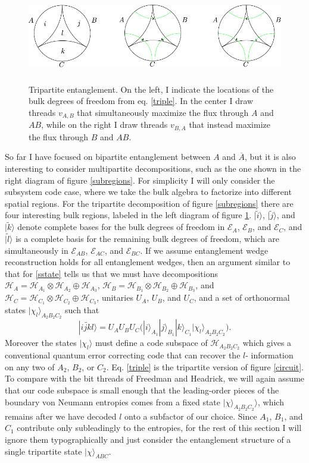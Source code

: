 \documentclass[12pt]{article}
\newcommand{\be}{\begin{equation}}
\newcommand{\ee}{\end{equation}}
\newcommand{\bfig}{\begin{figure}\begin{center}}
\newcommand{\efig}{\end{center}\end{figure}}
\newcommand{\ran}{\rangle}
\newcommand{\wt}{\widetilde}
\newcommand{\Hh}{\mathcal{H}}
\newcommand{\HA}{\mathcal{H}_A}
\newcommand{\Ab}{\ol{A}}
\newcommand{\ol}{\overline}
\begin{document}
\bfig
\includegraphics[height=4cm]{subregions2.pdf}
\caption{Tripartite entanglement.  On the left, I indicate the locations of the bulk degrees of freedom from eq. \eqref{triple}.  In the center I draw threads  $v_{A,B}$ that simultaneously maximize the flux through $A$ and $AB$, while on the right I draw threads $v_{B,A}$ that instead maximize the flux through $B$ and $AB$.}\label{mp}
\efig
So far I have focused on bipartite entanglement between $A$ and $\Ab$, but it is also interesting to consider multipartite decompositions, such as the one shown in the right diagram of figure \ref{subregions}.  For simplicity I will only consider the subsystem code case, where we take the bulk algebra to factorize into different spatial regions.  For the tripartite decomposition of figure \ref{subregions} there are four interesting bulk regions, labeled in the left diagram of figure \ref{mp}. $|\wt{i}\ran$, $|\wt{j}\ran$, and $|\wt{k}\ran$ denote complete bases for the bulk degrees of freedom in $\mathcal{E}_A$, $\mathcal{E}_B$, and $\mathcal{E}_C$, and $|\wt{l}\ran$ is a complete basis for the remaining bulk degrees of freedom, which are simultaneously in $\mathcal{E}_{AB}$, $\mathcal{E}_{AC}$, and $\mathcal{E}_{BC}$.  If we assume entanglement wedge reconstruction holds for all entanglement wedges, then an argument similar to that for \eqref{sstate} tells us that we must have decompositions $\HA=\Hh_{A_1}\otimes \Hh_{A_2}\oplus\Hh_{A_3}$, $\Hh_B=\Hh_{B_1}\otimes \Hh_{B_2}\oplus\Hh_{B_3}$, and $\Hh_C=\Hh_{C_1}\otimes \Hh_{C_2}\oplus\Hh_{C_3}$, unitaries $U_A$, $U_B$, and $U_C$, and a set of orthonormal states $|\chi_l\ran_{A_2B_2C_2}$ such that
\be\label{triple}
|\wt{ijkl}\ran=U_A U_B U_C \Big(|i\ran_{A_1}|j\ran_{B_1}|k\ran_{C_1} |\chi_l\ran_{A_2B_2C_2}\Big).
\ee
Moreover the states $|\chi_l\ran$ must define a code subspace of $\Hh_{A_2B_2C_2}$ which gives a conventional quantum error correcting code that can recover the $l$- information on any two of $A_2$, $B_2$, or $C_2$.  Eq. \eqref{triple} is the tripartite version of figure \ref{circuit}.  To compare with the bit threads of Freedman and Headrick, we will again assume that our code subspace is small enough that the leading-order pieces of the boundary von Neumann entropies comes from a fixed state $|\chi\ran_{A_2B_2C_2}\ran$, which remains after we have decoded $l$ onto a subfactor of our choice.  Since $A_1$, $B_1$, and $C_1$ contribute only subleadingly to the entropies, for the rest of this section I will ignore them typographically and just consider the entanglement structure of a single tripartite state $|\chi\ran_{ABC}$.  
\end{document}
